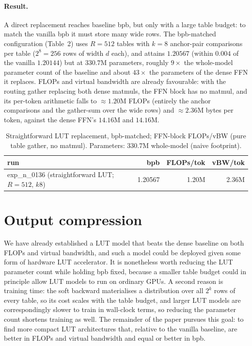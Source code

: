 \documentclass[11pt]{article}
\begin{document}
\paragraph{Result.} A direct replacement reaches baseline bpb, but only with a large table
budget: to match the vanilla bpb it must store many wide rows. The bpb-matched configuration
(Table~2) uses $R=512$ tables with $k=8$ anchor-pair
comparisons per table ($2^{8}=256$ rows of width $d$ each), and attains $1.20567$ (within
$0.004$ of the vanilla $1.20144$) but at
$330.7$M parameters, roughly $9\times$ the whole-model parameter count of the baseline and
about $43\times$ the parameters of the dense FFN it replaces. FLOPs and virtual bandwidth
are already favourable: with the routing gather replacing both dense matmuls, the FFN block has
no matmul, and its per-token arithmetic falls to $\approx 1.20$M FLOPs (entirely the anchor
comparisons and the gather-sum over the wide rows) and $\approx 2.36$M bytes per token, against
the dense FFN's $14.16$M and $14.16$M.

\begin{table}[h]\centering
\begin{tabular}{lrrr}
\toprule
run & bpb & FLOPs/tok & vBW/tok \\
\midrule
exp\_n\_0136 (straightforward LUT; $R{=}512$, $k8$) & 1.20567 & 1.20M & 2.36M \\
\bottomrule
\end{tabular}
\caption{Straightforward LUT replacement, bpb-matched; FFN-block FLOPs/vBW (pure table
gather, no matmul). Parameters: 330.7M whole-model (naive footprint).}
\end{table}

\section{Output compression}
\label{sec:compression}

We have already established a LUT model that beats the dense baseline on both FLOPs and virtual
bandwidth, and such a model could be deployed given some form of hardware LUT
accelerator. It is nonetheless worth reducing the LUT parameter count while holding bpb fixed,
because a smaller table budget could in principle allow LUT models to run on ordinary GPUs.
A second reason is training time: the soft backward materialises a distribution over all
$2^{k}$ rows of every table, so its cost scales with the table budget, and larger LUT models
are correspondingly slower to train in wall-clock terms, so reducing the parameter count
shortens training as well. The remainder of the paper pursues this goal: to find more compact
LUT architectures that, relative to the vanilla baseline, are better in FLOPs and virtual
bandwidth and equal or better in bpb.
\end{document}
